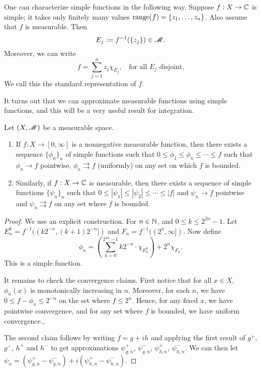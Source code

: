 \documentclass[12pt]{article} %
\begin{document}
\begin{remark}
    One can characterize simple functions in the following way. Suppose $f : X \to \mathbb{C}$ is simple; it takes only finitely many values $\operatorname{range}(f) = \{z_1, \ldots, z_n\}$. Also assume that $f$ is measurable. Then \[E_j := f^{-1}(\{z_j\}) \in \mathscr{M}.\] Moreover, we can write \[f = \sum_{j=1}^n z_j \chi_{E_j}, \ \ \ \ \text{for all $E_j$ disjoint}.\] We call this the standard representation of $f$.
\end{remark}

It turns out that we can approximate measurable functions using simple functions, and this will be a very useful result for integration.

\begin{theorem}\label{thm:simple-function-approximation}
    Let $(X, \mathscr{M})$ be a measurable space. \begin{enumerate}
        \item If $f : X \to [0,\infty]$ is a nonnegative measurable function, then there exists a sequence $\{\phi_n\}_n$ of simple functions such that $0 \leq \phi_1 \leq \phi_n \leq \cdots \leq f$ such that $\phi_n \to f$ pointwise, $\phi_n \rightrightarrows f$ (uniformly) on any set on which $f$ is bounded.
        \item Similarly, if $f : X \to \mathbb{C}$ is measurable, then there exists a sequence of simple functions $\{\psi_n\}_n$ such that $0 \leq |\psi_1| \leq |\psi_2| \leq \cdots \leq |f|$ and $\psi_n \to f$ pointwise and $\psi_n \rightrightarrows f$ on any set where $f$ is bounded.
    \end{enumerate}
\end{theorem}

\begin{proof}
    We use an explicit construction. For $n \in \mathbb{N}$, and $0 \leq k \leq 2^{2n} - 1$. Let $E_n^k = f^{-1}((k 2^{-n}, (k+1)2^{-n}])$ and $F_n = f^{-1}((2^n, \infty])$. Now define \[\phi_n = \left(\sum_{k=0}^{2^{2n}-1} k 2^{-n} \cdot \chi_{E_n^k} \right) + 2^n \chi_{F_n}.\] This is a simple function. 
    
    It remains to check the convergence claims. First notice that for all $x \in X$, $\phi_n(x)$ is monotonically increasing in $n$. Moreover, for each $n$, we have $0 \leq f - \phi_n \leq 2^{-n}$ on the set where $f \leq 2^{n}$. Hence, for any fixed $x$, we have pointwise convergence, and for any set where $f$ is bounded, we have uniform convergence., 

    The second claim follows by writing $f = g + ih$ and applying the first result of $g^+$, $g^-$, $h^+$ and $h^-$ to get approximations $\psi_{g, n}^+$, $\psi_{g, n}^-$, $\psi_{h, n}^+$, $\psi_{h, n}^-$. We can then let $\psi_n = (\psi_{g, n}^+ - \psi_{g, n}^-) + i(\psi_{h, n}^+ - \psi_{h, n}^-)$.
\end{proof}
\end{document}
